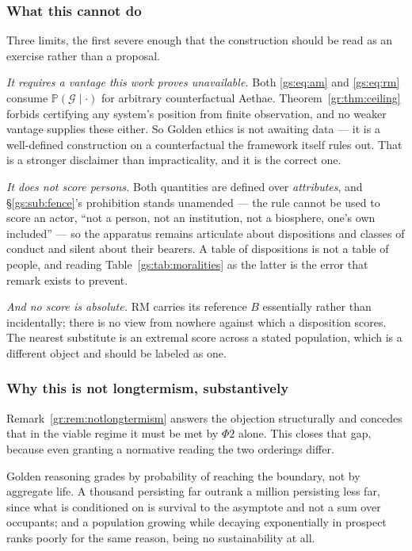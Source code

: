 \documentclass[11pt]{article}
\numberwithin{equation}{section}
\theoremstyle{plain}
\theoremstyle{definition}
\theoremstyle{remark}
\newcommand{\PP}{\mathbb{P}}
\begin{document}
\subsubsection{What this cannot do}\label{gs:ssub:limits}

Three limits, the first severe enough that the construction should be
read as an exercise rather than a proposal.

\emph{It requires a vantage this work proves unavailable.} Both
\eqref{gs:eq:am} and \eqref{gs:eq:rm} consume
$\PP(\mathcal G\mid\cdot)$ for arbitrary counterfactual Aethae.
Theorem~\ref{gr:thm:ceiling} forbids certifying any system's position
from finite observation, and no weaker vantage supplies these either. So
Golden ethics is not awaiting data --- it is a well-defined construction
on a counterfactual the framework itself rules out. That is a stronger
disclaimer than impracticality, and it is the correct one.

\emph{It does not score persons.} Both quantities are defined over
\emph{attributes}, and \S\ref{gs:sub:fence}'s prohibition stands
unamended --- the rule cannot be used to score an actor, ``not a person,
not an institution, not a biosphere, one's own included'' --- so the
apparatus remains articulate about dispositions and classes of conduct
and silent about their bearers. A table of dispositions
is not a table of people, and reading
Table~\ref{gs:tab:moralities} as the latter is the error that remark
exists to prevent.

\emph{And no score is absolute.} $\mathrm{RM}$ carries its reference $B$
essentially rather than incidentally; there is no view from nowhere
against which a disposition scores. The nearest substitute is an extremal
score across a stated population, which is a different object and should
be labeled as one.

\subsubsection{Why this is not longtermism, substantively}
\label{gs:ssub:notlongtermism2}

Remark~\ref{gr:rem:notlongtermism} answers the objection structurally and
concedes that in the viable regime it must be met by $\Phi2$ alone. This
closes that gap, because even granting a normative reading the two
orderings differ.

Golden reasoning grades by probability of reaching the boundary, not by
aggregate life. A thousand persisting far outrank a million persisting
less far, since what is conditioned on is survival to the asymptote and
not a sum over occupants; and a population growing while decaying
exponentially in prospect ranks poorly for the same reason, being no
sustainability at all.
\end{document}

